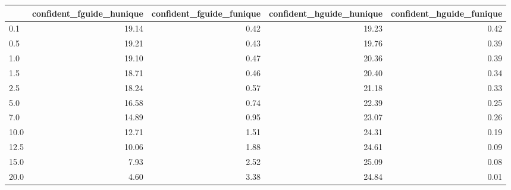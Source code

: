 \begin{tabular}{lrrrr}
\toprule
 & confident_fguide_hunique & confident_fguide_funique & confident_hguide_hunique & confident_hguide_funique \\
\midrule
0.1 & 19.14 & 0.42 & 19.23 & 0.42 \\
0.5 & 19.21 & 0.43 & 19.76 & 0.39 \\
1.0 & 19.10 & 0.47 & 20.36 & 0.39 \\
1.5 & 18.71 & 0.46 & 20.40 & 0.34 \\
2.5 & 18.24 & 0.57 & 21.18 & 0.33 \\
5.0 & 16.58 & 0.74 & 22.39 & 0.25 \\
7.0 & 14.89 & 0.95 & 23.07 & 0.26 \\
10.0 & 12.71 & 1.51 & 24.31 & 0.19 \\
12.5 & 10.06 & 1.88 & 24.61 & 0.09 \\
15.0 & 7.93 & 2.52 & 25.09 & 0.08 \\
20.0 & 4.60 & 3.38 & 24.84 & 0.01 \\
\bottomrule
\end{tabular}

